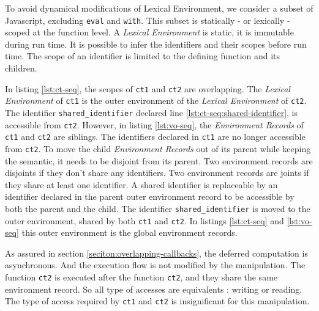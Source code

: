 To avoid dynamical modifications of Lexical Environment, we consider a subset of Javascript, excluding \texttt{eval} and \texttt{with}.
This subset is statically - or lexically - scoped at the function level.
A \textit{Lexical Environment} is static, it is immutable during run time.
It is possible to infer the identifiers and their scopes before run time.
The scope of an identifier is limited to the defining function and its children.

In listing \ref{lst:ct-seq}, the scopes of \texttt{ct1} and \texttt{ct2} are overlapping.
The \textit{Lexical Environment} of \texttt{ct1} is the outer environment of the \textit{Lexical Environment} of \texttt{ct2}.
The identifier \texttt{shared_identifier} declared line \ref{lst:ct-seq:shared-identifier}, is accessible from \texttt{ct2}.
However, in listing \ref{lst:vo-seq}, the \textit{Environment Records} of \texttt{ct1} and \texttt{ct2} are siblings.
The identifiers declared in \texttt{ct1} are no longer accessible from \texttt{ct2}.
To move the child \textit{Environment Records} out of its parent while keeping the semantic, it needs to be disjoint from its parent.
Two environment records are disjoints if they don't share any identifiers.
Two environment records are joints if they share at least one identifier.
A shared identifier is replaceable by an identifier declared in the parent outer environment record to be accessible by both the parent and the child.
The identifier \texttt{shared_identifier} is moved to the outer environment, shared by both \texttt{ct1} and \texttt{ct2}.
In listings \ref{lst:ct-seq} and \ref{lst:vo-seq} this outer environment is the global environment records.

As assured in section \ref{seciton:overlapping-callbacks}, the deferred computation is asynchronous.
And the execution flow is not modified by the manipulation.
The function \texttt{ct2} is executed after the function \texttt{ct2}, and they share the same environment record.
So all type of accesses are equivalents : writing or reading.
The type of access required by \texttt{ct1} and \texttt{ct2} is insignificant for this manipulation.




